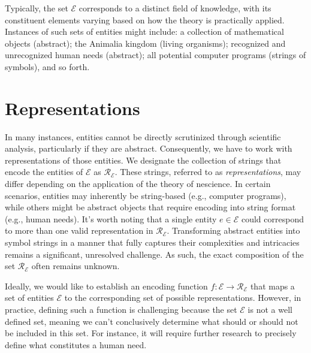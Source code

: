 Typically, the set $\mathcal{E}$ corresponds to a distinct field of knowledge, with its constituent elements varying based on how the theory is practically applied. Instances of such sets of entities might include: a collection of mathematical objects (abstract); the Animalia kingdom (living organisms); recognized and unrecognized human needs (abstract); all potential computer programs (strings of symbols), and so forth.

%
%

\section{Representations}

In many instances, entities cannot be directly scrutinized through scientific analysis, particularly if they are abstract. Consequently, we have to work with representations of those entities. We designate the collection of strings that encode the entities of $\mathcal{E}$ as $\mathcal{R_\mathcal{E}}$. These strings, referred to as \emph{representations}, may differ depending on the application of the theory of nescience. In certain scenarios, entities may inherently be string-based (e.g., computer programs), while others might be abstract objects that require encoding into string format (e.g., human needs). It's worth noting that a single entity $e \in \mathcal{E}$ could correspond to more than one valid representation in $\mathcal{R_\mathcal{E}}$. Transforming abstract entities into symbol strings in a manner that fully captures their complexities and intricacies remains a significant, unresolved challenge. As such, the exact composition of the set $\mathcal{R_\mathcal{E}}$ often remains unknown.

Ideally, we would like to establish an encoding function $f:\mathcal{E} \rightarrow \mathcal{R_\mathcal{E}}$ that maps a set of entities $\mathcal{E}$ to the corresponding set of possible representations. However, in practice, defining such a function is challenging because the set $\mathcal{E}$ is not a well defined set, meaning we can't conclusively determine what should or should not be included in this set. For instance, it will require further research to precisely define what constitutes a human need.

